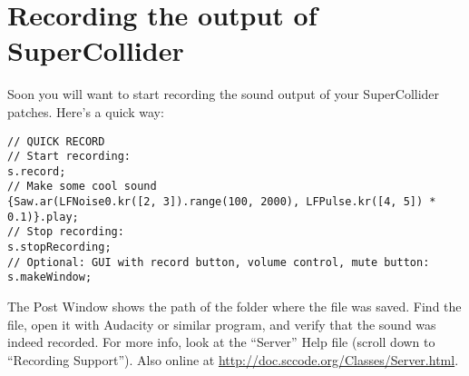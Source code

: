 \section{Recording the output of SuperCollider}

Soon you will want to start recording the sound output of your SuperCollider patches. Here's a quick way:
 
\begin{lstlisting}[style=SuperCollider-IDE, basicstyle=\scttfamily\footnotesize]
// QUICK RECORD
// Start recording:
s.record;
// Make some cool sound
{Saw.ar(LFNoise0.kr([2, 3]).range(100, 2000), LFPulse.kr([4, 5]) * 0.1)}.play;
// Stop recording:
s.stopRecording;
// Optional: GUI with record button, volume control, mute button:
s.makeWindow;
\end{lstlisting}
 
The Post Window shows the path of the folder where the file was saved. Find the file, open it with Audacity or similar program, and verify that the sound was indeed recorded. For more info, look at the ``Server'' Help file (scroll down to ``Recording Support''). Also online at \url{http://doc.sccode.org/Classes/Server.html}.